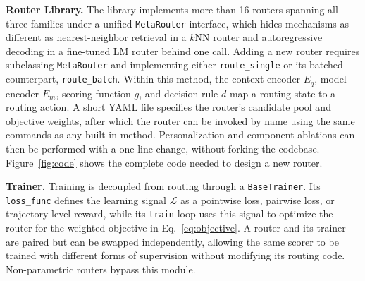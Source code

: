 \noindent\textbf{Router Library.} The library implements more than 16 routers spanning all three families under a unified \texttt{MetaRouter} interface, which hides mechanisms as different as nearest-neighbor retrieval in a $k$NN router and autoregressive decoding in a fine-tuned LM router behind one call. Adding a new router requires subclassing \texttt{MetaRouter} and implementing either \texttt{route\_single} or its batched counterpart, \texttt{route\_batch}. Within this method, the context encoder $E_q$, model encoder $E_m$, scoring function $g$, and decision rule $d$ map a routing state to a routing action. A short YAML file specifies the router's candidate pool and objective weights, after which the router can be invoked by name using the same commands as any built-in method. Personalization and component ablations can then be performed with a one-line change, without forking the codebase. Figure~\ref{fig:code} shows the complete code needed to design a new router.




\noindent\textbf{Trainer.} Training is decoupled from routing through a \texttt{BaseTrainer}. Its \texttt{loss\_func} defines the learning signal $\mathcal{L}$ as a pointwise loss, pairwise loss, or trajectory-level reward, while its \texttt{train} loop uses this signal to optimize the router for the weighted objective in Eq.~\ref{eq:objective}. A router and its trainer are paired but can be swapped independently, allowing the same scorer to be trained with different forms of supervision without modifying its routing code. Non-parametric routers bypass this module.


